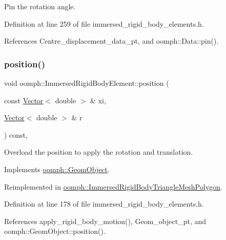 Pin the rotation angle. 



Definition at line 259 of file immersed\+\_\+rigid\+\_\+body\+\_\+elements.\+h.



References Centre\+\_\+displacement\+\_\+data\+\_\+pt, and oomph\+::\+Data\+::pin().

\mbox{\label{classoomph_1_1ImmersedRigidBodyElement_a14f5acb186ecd1168dfa08dcf242c538}} 
\subsubsection{\texorpdfstring{position()}{position()}\hspace{0.1cm}{\footnotesize\ttfamily [1/2]}}
{\footnotesize\ttfamily void oomph\+::\+Immersed\+Rigid\+Body\+Element\+::position (\begin{DoxyParamCaption}\item[{const \hyperlink{classoomph_1_1Vector}{Vector}$<$ double $>$ \&}]{xi,  }\item[{\hyperlink{classoomph_1_1Vector}{Vector}$<$ double $>$ \&}]{r }\end{DoxyParamCaption}) const\hspace{0.3cm}{\ttfamily [inline]}, {\ttfamily [virtual]}}



Overload the position to apply the rotation and translation. 



Implements \hyperlink{classoomph_1_1GeomObject_a0d04c9d4667817f3ef24bb660fd56065}{oomph\+::\+Geom\+Object}.



Reimplemented in \hyperlink{classoomph_1_1ImmersedRigidBodyTriangleMeshPolygon_a29e3518f6fcdaeead14ae41f11e6fb5d}{oomph\+::\+Immersed\+Rigid\+Body\+Triangle\+Mesh\+Polygon}.



Definition at line 178 of file immersed\+\_\+rigid\+\_\+body\+\_\+elements.\+h.



References apply\+\_\+rigid\+\_\+body\+\_\+motion(), Geom\+\_\+object\+\_\+pt, and oomph\+::\+Geom\+Object\+::position().



